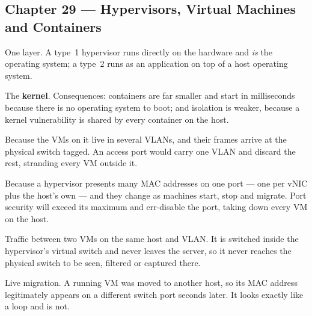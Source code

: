\subsection*{Chapter 29 --- Hypervisors, Virtual Machines and Containers}
\begin{tightnum}
  \item One layer. A type~1 hypervisor runs directly on the hardware and \emph{is}
        the operating system; a type~2 runs as an application on top of a host
        operating system.
  \item The \textbf{kernel}. Consequences: containers are far smaller and start in
        milliseconds because there is no operating system to boot; and isolation
        is weaker, because a kernel vulnerability is shared by every container on
        the host.
  \item Because the VMs on it live in several VLANs, and their frames arrive at
        the physical switch tagged. An access port would carry one VLAN and
        discard the rest, stranding every VM outside it.
  \item Because a hypervisor presents many MAC addresses on one port --- one per
        vNIC plus the host's own --- and they change as machines start, stop and
        migrate. Port security will exceed its maximum and err-disable the port,
        taking down every VM on the host.
  \item Traffic between two VMs on the same host and VLAN. It is switched inside
        the hypervisor's virtual switch and never leaves the server, so it never
        reaches the physical switch to be seen, filtered or captured there.
  \item Live migration. A running VM was moved to another host, so its MAC address
        legitimately appears on a different switch port seconds later. It looks
        exactly like a loop and is not.
\end{tightnum}

